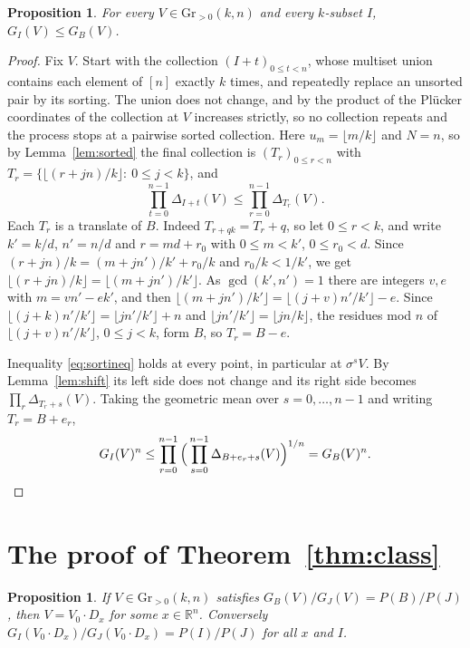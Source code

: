 \documentclass[11pt]{article}
\newtheorem{proposition}[theorem]{Proposition}
\theoremstyle{remark}
\newcommand{\Gr}{\mathrm{Gr}}
\newcommand{\R}{\mathbb{R}}
\begin{document}
\begin{proposition}\label{prop:GB}
For every $V\in\Gr_{>0}(k,n)$ and every $k$-subset $I$, $G_I(V)\le G_B(V)$.
\end{proposition}

\begin{proof}
Fix $V$. Start with the collection $(I+t)_{0\le t<n}$, whose multiset union contains each element of $[n]$ exactly $k$ times, and repeatedly replace an unsorted pair by its sorting. The union does not change, and by \cite[Corollary~6.5]{FP} the product of the Pl\"ucker coordinates of the collection at $V$ increases strictly, so no collection repeats and the process stops at a pairwise sorted collection. Here $u_m=\lfloor m/k\rfloor$ and $N=n$, so by Lemma~\ref{lem:sorted} the final collection is $(T_r)_{0\le r<n}$ with $T_r=\{\lfloor(r+jn)/k\rfloor:\ 0\le j<k\}$, and
\begin{equation}\label{eq:sortineq}
\prod_{t=0}^{n-1}\Delta_{I+t}(V)\le\prod_{r=0}^{n-1}\Delta_{T_r}(V).
\end{equation}
Each $T_r$ is a translate of $B$. Indeed $T_{r+qk}=T_r+q$, so let $0\le r<k$, and write $k'=k/d$, $n'=n/d$ and $r=md+r_0$ with $0\le m<k'$, $0\le r_0<d$. Since $(r+jn)/k=(m+jn')/k'+r_0/k$ and $r_0/k<1/k'$, we get $\lfloor(r+jn)/k\rfloor=\lfloor(m+jn')/k'\rfloor$. As $\gcd(k',n')=1$ there are integers $v,e$ with $m=vn'-ek'$, and then $\lfloor(m+jn')/k'\rfloor=\lfloor(j+v)n'/k'\rfloor-e$. Since $\lfloor(j+k)n'/k'\rfloor=\lfloor jn'/k'\rfloor+n$ and $\lfloor jn'/k'\rfloor=\lfloor jn/k\rfloor$, the residues mod $n$ of $\lfloor(j+v)n'/k'\rfloor$, $0\le j<k$, form $B$, so $T_r=B-e$.

Inequality \eqref{eq:sortineq} holds at every point, in particular at $\sigma^sV$. By Lemma~\ref{lem:shift} its left side does not change and its right side becomes $\prod_r\Delta_{T_r+s}(V)$. Taking the geometric mean over $s=0,\dots,n-1$ and writing $T_r=B+e_r$,
\[
G_I(V)^n\le\prod_{r=0}^{n-1}\Big(\prod_{s=0}^{n-1}\Delta_{B+e_r+s}(V)\Big)^{1/n}=G_B(V)^n.\qedhere
\]
\end{proof}

\section{The proof of Theorem~\ref{thm:class}}\label{sec:min}

\begin{proposition}\label{prop:rigid}
If $V\in\Gr_{>0}(k,n)$ satisfies $G_B(V)/G_J(V)=P(B)/P(J)$, then $V=V_0\cdot D_x$ for some $x\in\R^n$. Conversely $G_I(V_0\cdot D_x)/G_J(V_0\cdot D_x)=P(I)/P(J)$ for all $x$ and $I$.
\end{proposition}
\end{document}
